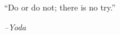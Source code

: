 \documentclass{ut-thesis}
\begin{document}
\begin{preliminary}
\begin{abstract}
\end{abstract}



\vspace*{\fill}
\begin{center}
\begin{minipage}[c]{4.75in}
{\charles
  ``Do or do not; there is no try.''\vspace{2em}

\hfill \emph{--Yoda}}

\end{minipage}
\end{center}
\vspace*{\fill}


\cleardoublepage



\end{preliminary}
\end{document}
